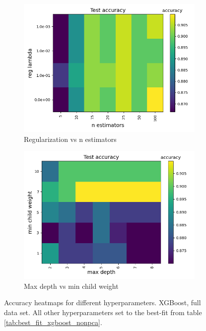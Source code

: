 \documentclass[a4paper]{article}
\begin{document}
\begin{figure}[H]
\begin{subfigure}{0.49\textwidth}
    \includegraphics[scale=0.45]{../figures/xgboost/heatmaps/heatmap_nbins200_pca0_seed4155_ts0.20_accuracy_n_estimators_reg_lambda.png}
    \caption{Regularization vs n estimators}
  \end{subfigure}
  \begin{subfigure}{0.49\textwidth}
    \includegraphics[scale=0.45]{../figures/xgboost/heatmaps/heatmap_nbins200_pca0_seed4155_ts0.20_accuracy_max_depth_min_child_weight.png}
    \caption{Max depth vs min child weight}
  \end{subfigure}
  \caption{Accuracy heatmaps for different hyperparameters. XGBoost, full data set. All other hyperparameters set to the best-fit from table \ref{tab:best_fit_xgboost_nonpca}.}
  \label{fig:app_xgboost_nonpca}
\end{figure}
\end{document}
